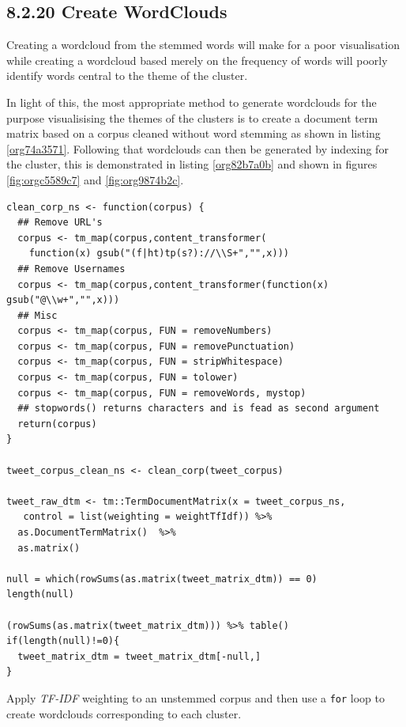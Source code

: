 \documentclass[11pt]{article}
\begin{document}
\subsection{8.2.20 Create WordClouds}
\label{sec:org8ea4689}
Creating a wordcloud from the stemmed words will make for a poor visualisation
while creating a wordcloud based merely on the frequency of words will poorly
identify words central to the theme of the cluster.

In light of this, the most appropriate method to generate wordclouds for the
purpose visualisising the themes of the clusters is to create a document term
matrix based on a corpus cleaned without word stemming as shown in listing \ref{org74a3571}.
Following that wordclouds can then be generated by indexing for the cluster,
this is demonstrated in listing \ref{org82b7a0b} and shown in figures \ref{fig:orgc5589c7} and \ref{fig:org9874b2c}.


\begin{listing}[htbp]
\begin{verbatim}
clean_corp_ns <- function(corpus) {
  ## Remove URL's
  corpus <- tm_map(corpus,content_transformer(
    function(x) gsub("(f|ht)tp(s?)://\\S+","",x)))
  ## Remove Usernames
  corpus <- tm_map(corpus,content_transformer(function(x) gsub("@\\w+","",x)))
  ## Misc
  corpus <- tm_map(corpus, FUN = removeNumbers)
  corpus <- tm_map(corpus, FUN = removePunctuation)
  corpus <- tm_map(corpus, FUN = stripWhitespace)
  corpus <- tm_map(corpus, FUN = tolower)
  corpus <- tm_map(corpus, FUN = removeWords, mystop)
  ## stopwords() returns characters and is fead as second argument
  return(corpus)
}

tweet_corpus_clean_ns <- clean_corp(tweet_corpus)

tweet_raw_dtm <- tm::TermDocumentMatrix(x = tweet_corpus_ns,
   control = list(weighting = weightTfIdf)) %>%
  as.DocumentTermMatrix()  %>%
  as.matrix()

null = which(rowSums(as.matrix(tweet_matrix_dtm)) == 0)
length(null)

(rowSums(as.matrix(tweet_matrix_dtm))) %>% table()
if(length(null)!=0){
  tweet_matrix_dtm = tweet_matrix_dtm[-null,]
}

\end{verbatim}
\caption{\label{org74a3571}Apply \emph{TF-IDF} weighting to an unstemmed corpus and then use a \texttt{for} loop to create wordclouds corresponding to each cluster.}
\end{listing}
\end{document}
